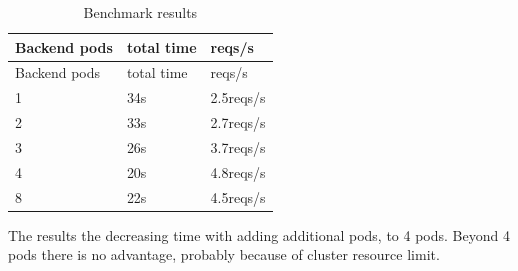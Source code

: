 \begin{longtable}[c]{@{}lll@{}}
\caption{Benchmark results}\tabularnewline
\toprule
Backend pods & total time & reqs/s\tabularnewline
\midrule
\endfirsthead
\toprule
Backend pods & total time & reqs/s\tabularnewline
\midrule
\endhead
1 & 34s & 2.5reqs/s\tabularnewline
2 & 33s & 2.7reqs/s\tabularnewline
3 & 26s & 3.7reqs/s\tabularnewline
4 & 20s & 4.8reqs/s\tabularnewline
8 & 22s & 4.5reqs/s\tabularnewline
\bottomrule
\end{longtable}

The results the decreasing time with adding additional pods, to 4 pods.
Beyond 4 pods there is no advantage, probably because of cluster
resource limit.